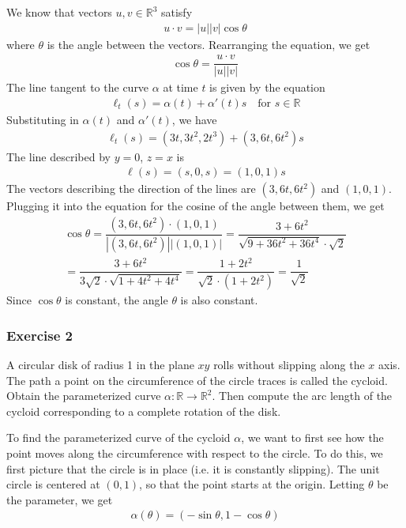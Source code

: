 \documentclass{article}
\newcommand{\R}{\mathbb{R}}
\begin{document}
	We know that vectors $u, v \in \R^3$ satisfy
	\begin{gather*}
		u \cdot v = |u| |v| \cos \theta
	\end{gather*}
	where $\theta$ is the angle between the vectors. Rearranging the equation, we get
	\begin{gather*}
		\cos \theta = \dfrac{u \cdot v}{|u| |v|}
	\end{gather*}
	The line tangent to the curve $\alpha$ at time $t$ is given by the equation
	\begin{gather*}
		\ell_t(s) = \alpha(t) + \alpha'(t)s \quad \text{for } s \in \R
	\end{gather*}
	Substituting in $\alpha(t)$ and $\alpha'(t)$, we have
	\begin{gather*}
		\ell_t(s) = (3t, 3t^2, 2t^3) + (3, 6t, 6t^2)s
	\end{gather*}
	The line described by $y = 0$, $z = x$ is
	\begin{gather*}
		\ell(s) = (s, 0, s) = (1, 0, 1)s
	\end{gather*}
	The vectors describing the direction of the lines are $(3, 6t, 6t^2)$ and $(1, 0, 1)$. Plugging it into the equation for the cosine of the angle between them, we get
	\begin{gather*}
		\cos \theta = \dfrac{(3, 6t, 6t^2) \cdot (1, 0, 1)}{|(3, 6t, 6t^2)| |(1, 0, 1)|} = \dfrac{3 + 6t^2}{\sqrt{9 + 36t^2 + 36t^4} \cdot \sqrt{2}} \\
		= \dfrac{3 + 6t^2}{3 \sqrt{2} \cdot \sqrt{1 + 4t^2 + 4t^4} } = \dfrac{1 + 2t^2}{\sqrt{2} \cdot (1 + 2t^2)} = \dfrac{1}{\sqrt{2}}
	\end{gather*}
	Since $\cos \theta$ is constant, the angle $\theta$ is also constant.
	
	\subsubsection*{Exercise 2}
	A circular disk of radius 1 in the plane $xy$ rolls without slipping along the $x$ axis. The path a point on the circumference of the circle traces is called the cycloid. Obtain the parameterized curve $\alpha \colon \R \to \R^2$. Then compute the arc length of the cycloid corresponding to a complete rotation of the disk.
	
	To find the parameterized curve of the cycloid $\alpha$, we want to first see how the point moves along the circumference with respect to the circle. To do this, we first picture that the circle is in place (i.e. it is constantly slipping). The unit circle is centered at $(0, 1)$, so that the point starts at the origin. Letting $\theta$ be the parameter, we get
	\begin{gather*}
		\alpha(\theta) = (-\sin \theta, 1 - \cos \theta)
	\end{gather*}
	
\end{document}
